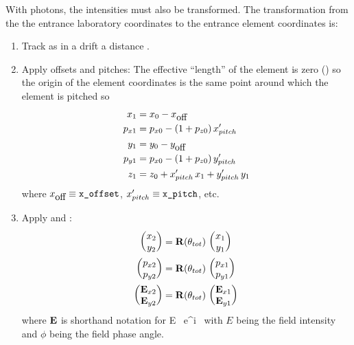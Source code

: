 With photons, the intensities must also be transformed.
The transformation from the the entrance laboratory coordinates to
the entrance element coordinates is:
\begin{enumerate}
\item
Track as in a drift a distance .
\item
{}
Apply offsets and pitches: The effective ``length'' of the element is
zero () so the origin of the element coordinates
is the same point around which the element is pitched so
\begin{align}
  x_1    &= x_0 - x_{\mbox{off}} \nonumber \\
  p_{x1} &= p_{x0} - (1 + p_{z0}) \, x'_{pitch} \nonumber \\
  y_1    &= y_0 - y_{\mbox{off}} \\
  p_{y1} &= p_{x0} - (1 + p_{z0}) \, y'_{pitch} \nonumber \\
  z_1    &= z_0 + x'_{pitch} \, x_1 + y'_{pitch} \, y_1 \nonumber
\end{align}
where $x_{\mbox{off}} \equiv \vn{x_offset}$, $x'_{pitch} \equiv \vn{x_pitch}$, etc.
\item
Apply  and :
\begin{align}
  \begin{pmatrix} x_2 \\ y_2 \end{pmatrix} &=
    {\bf R} (\theta_{tot}) \,   
  \begin{pmatrix} x_1 \\ y_1 \end{pmatrix} \nonumber \\
  \begin{pmatrix} p_{x2} \\ p_{y2} \end{pmatrix} &=
    {\bf R} (\theta_{tot}) \, 
  \begin{pmatrix} p_{x1} \\ p_{y1} \end{pmatrix} \label{xyrtxy} \\ 
  \begin{pmatrix} {\bf E}_{x2} \\ {\bf E}_{y2} \end{pmatrix} &=
    {\bf R} (\theta_{tot}) \,   \begin{pmatrix} {\bf E}_{x1} \\ {\bf E}_{y1} \end{pmatrix} \nonumber
\end{align}
where ${\bf E}$ is shorthand notation for
\Begineq
  \bfE \equiv E \, e^{i \, \phi}
\Endeq
with $E$ being the field intensity and $\phi$ being the field phase angle.

\end{enumerate}
